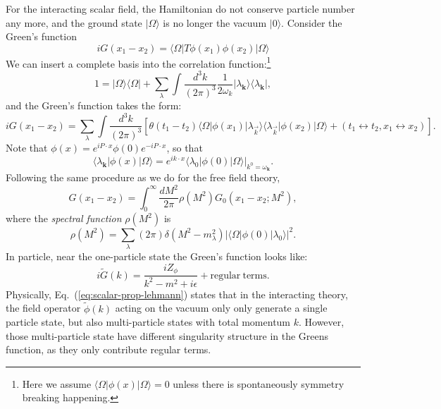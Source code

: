 For the interacting scalar field, the Hamiltonian do not conserve particle number any more, and the ground state $|\Omega\rangle$ is no longer the vacuum $|0\rangle$.
Consider the Green's function
\begin{equation}
	iG(x_1-x_2) = \langle\Omega|T\phi(x_1)\phi(x_2)|\Omega\rangle 
\end{equation}
We can insert a complete basis into the correlation function:\footnote{Here we assume $\langle\Omega|\phi(x)|\Omega\rangle=0$ unless there is spontaneously symmetry breaking happening.}
\begin{equation}
	1 = |\Omega\rangle\langle\Omega| + \sum_\lambda\int\frac{d^3 k}{(2\pi)^3}\frac{1}{2\omega_k}|\lambda_{\bm k}\rangle \langle\lambda_{\bm k}|,
\end{equation}
and the Green's function takes the form:
\begin{equation*}
	iG(x_1-x_2) = \sum_\lambda \int\frac{d^3 k}{(2\pi)^3}
	\left[\theta(t_1-t_2)\langle\Omega|\phi(x_1)|\lambda_{\vec k}\rangle\langle\lambda_{\vec k}|\phi(x_2)|\Omega\rangle + (t_1\leftrightarrow t_2, x_1 \leftrightarrow x_2)\right].
\end{equation*}
Note that $\phi(x)=e^{iP\cdot x}\phi(0) e^{-iP\cdot x}$, so that
\begin{equation}
	\langle\lambda_{\bm k}|\phi(x)|\Omega\rangle 
	= e^{ik\cdot x} \left.\langle\lambda_{0}|\phi(0)|\Omega\rangle\right|_{k^0=\omega_{\bm k}}.
\end{equation}
Following the same procedure as we do for the free field theory, 
\begin{equation}
	G(x_1-x_2) = \int_0^\infty \frac{dM^2}{2\pi} \rho(M^2) G_0(x_1-x_2;M^2),
\end{equation}
where the \textit{spectral function} $\rho(M^2)$ is
\begin{equation}
	\rho(M^2) = \sum_\lambda(2\pi)\delta(M^2-m_\lambda^2)|\langle\Omega|\phi(0)|\lambda_0\rangle|^2.
\end{equation}
In particle, near the one-particle state the Green's function looks like:
\begin{equation}\label{eq:scalar-prop-lehmann}
	i\tilde G(k) = \frac{iZ_{\phi}}{k^2-m^2+i\epsilon} + \mathrm{regular\ terms}.
\end{equation}
Physically, Eq.~(\ref{eq:scalar-prop-lehmann}) states that in the interacting theory, the field operator $\tilde\phi(k)$ acting on the vacuum only only generate a single particle state, but also multi-particle states with total momentum $k$.
However, those multi-particle state have different singularity structure in the Greens function, as they only contribute regular terms.
